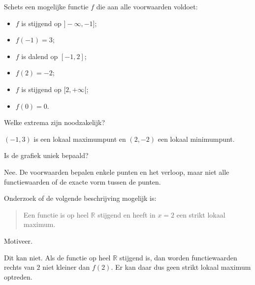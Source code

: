\documentclass{ximera}
\begin{document}
\begin{oefening}{\oefU\ESS}

Schets een mogelijke functie \(f\) die aan alle voorwaarden voldoet:
\begin{itemize}
  \item \(f\) is stijgend op \(]-\infty,-1]\);
  \item \(f(-1)=3\);
  \item \(f\) is dalend op \([-1,2]\);
  \item \(f(2)=-2\);
  \item \(f\) is stijgend op \([2,+\infty[\);
  \item \(f(0)=0\).
\end{itemize}

\begin{question}
Welke extrema zijn noodzakelijk?
\begin{oplossing}
\((-1,3)\) is een lokaal maximumpunt en \((2,-2)\) een lokaal minimumpunt.
\end{oplossing}
\end{question}

\begin{question}
Is de grafiek uniek bepaald?
\begin{oplossing}
Nee. De voorwaarden bepalen enkele punten en het verloop, maar niet alle
functiewaarden of de exacte vorm tussen de punten.
\end{oplossing}
\end{question}
\end{oefening}

\begin{oefening}{\oefG}

Onderzoek of de volgende beschrijving mogelijk is:

\begin{quote}
Een functie is op heel \(\mathbb{R}\) stijgend en heeft in \(x=2\)
een strikt lokaal maximum.
\end{quote}

Motiveer.

\begin{oplossing}
Dit kan niet. Als de functie op heel \(\mathbb{R}\) stijgend is,
dan worden functiewaarden rechts van \(2\) niet kleiner dan \(f(2)\).
Er kan daar dus geen strikt lokaal maximum optreden.
\end{oplossing}
\end{oefening}
\end{document}
